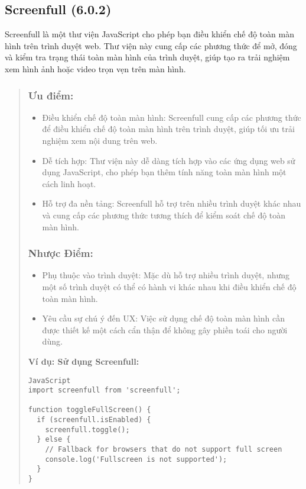 \subsection{Screenfull (6.0.2)}

Screenfull là một thư viện JavaScript cho phép bạn điều khiển chế độ toàn màn hình trên trình duyệt web. Thư viện này cung cấp các phương thức để mở, đóng và kiểm tra trạng thái toàn màn hình của trình duyệt, giúp tạo ra trải nghiệm xem hình ảnh hoặc video trọn vẹn trên màn hình.

\begin{quote}
\subsubsection{Ưu điểm:}
\begin{itemize}
  \item Điều khiển chế độ toàn màn hình: Screenfull cung cấp các phương thức để điều khiển chế độ toàn màn hình trên trình duyệt, giúp tối ưu trải nghiệm xem nội dung trên web.
  \item Dễ tích hợp: Thư viện này dễ dàng tích hợp vào các ứng dụng web sử dụng JavaScript, cho phép bạn thêm tính năng toàn màn hình một cách linh hoạt.
  \item Hỗ trợ đa nền tảng: Screenfull hỗ trợ trên nhiều trình duyệt khác nhau và cung cấp các phương thức tương thích để kiểm soát chế độ toàn màn hình.
\end{itemize}

\subsubsection{Nhược Điểm:}
\begin{itemize}
  \item Phụ thuộc vào trình duyệt: Mặc dù hỗ trợ nhiều trình duyệt, nhưng một số trình duyệt có thể có hành vi khác nhau khi điều khiển chế độ toàn màn hình.
  \item Yêu cầu sự chú ý đến UX: Việc sử dụng chế độ toàn màn hình cần được thiết kế một cách cẩn thận để không gây phiền toái cho người dùng.
\end{itemize}

\textbf{Ví dụ: Sử dụng Screenfull:}
\begin{lstlisting}
JavaScript
import screenfull from 'screenfull';

function toggleFullScreen() {
  if (screenfull.isEnabled) {
    screenfull.toggle();
  } else {
    // Fallback for browsers that do not support full screen
    console.log('Fullscreen is not supported');
  }
}
\end{lstlisting}
\end{quote}



